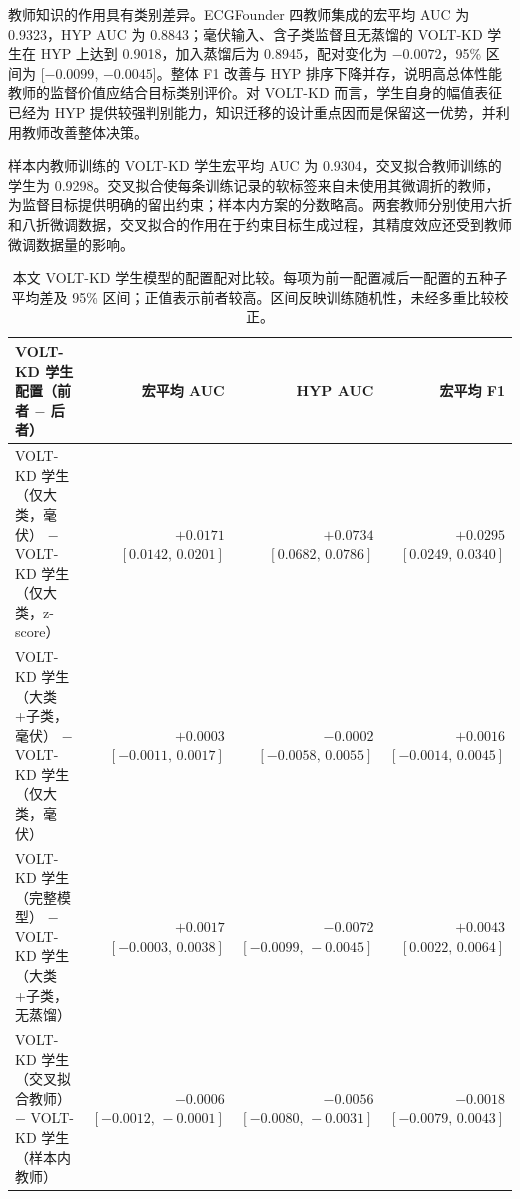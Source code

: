 \documentclass[11pt,a4paper,UTF8,fontset=windows]{ctexart}
\begin{document}
教师知识的作用具有类别差异。ECGFounder 四教师集成的宏平均 AUC 为 0.9323，HYP AUC 为 0.8843；毫伏输入、含子类监督且无蒸馏的 VOLT-KD 学生在 HYP 上达到 0.9018，加入蒸馏后为 0.8945，配对变化为 $-0.0072$，95\% 区间为 [$-0.0099$, $-0.0045$]。整体 F1 改善与 HYP 排序下降并存，说明高总体性能教师的监督价值应结合目标类别评价。对 VOLT-KD 而言，学生自身的幅值表征已经为 HYP 提供较强判别能力，知识迁移的设计重点因而是保留这一优势，并利用教师改善整体决策。

样本内教师训练的 VOLT-KD 学生宏平均 AUC 为 0.9304，交叉拟合教师训练的学生为 0.9298。交叉拟合使每条训练记录的软标签来自未使用其微调折的教师，为监督目标提供明确的留出约束；样本内方案的分数略高。两套教师分别使用六折和八折微调数据，交叉拟合的作用在于约束目标生成过程，其精度效应还受到教师微调数据量的影响。
\begin{table}[htbp]
\centering\footnotesize
\setlength{\tabcolsep}{4pt}
\caption{本文 VOLT-KD 学生模型的配置配对比较。每项为前一配置减后一配置的五种子平均差及 95\% 区间；正值表示前者较高。区间反映训练随机性，未经多重比较校正。}\label{tab:effects}
\begin{tabularx}{\linewidth}{Yrrr}
\toprule
VOLT-KD 学生配置（前者 $-$ 后者） & 宏平均 AUC & HYP AUC & 宏平均 F1 \\
\midrule
VOLT-KD 学生（仅大类，毫伏） $-$ VOLT-KD 学生（仅大类，z-score） &  &  &  \\
VOLT-KD 学生（大类+子类，毫伏） $-$ VOLT-KD 学生（仅大类，毫伏） &  &  &  \\
VOLT-KD 学生（完整模型） $-$ VOLT-KD 学生（大类+子类，无蒸馏） &  &  &  \\
VOLT-KD 学生（交叉拟合教师） $-$ VOLT-KD 学生（样本内教师） &  &  &  \\
\bottomrule
\end{tabularx}
\par\vspace{3pt}{\footnotesize 除输入处理对照外，各配置均使用毫伏输入。无蒸馏配置使用大类与子类目标；教师方案对照比较相应软标签训练所得的 VOLT-KD 学生。}

\end{table}
\end{document}
